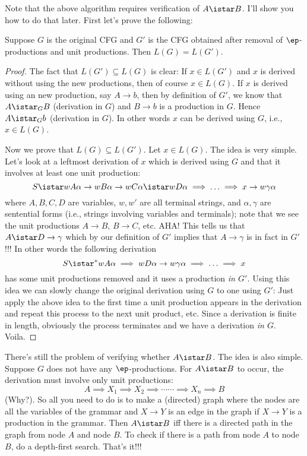 Note that the above algorithm requires verification of $A \istar
B$. I'll show you how to do that later. First let's prove the
following:

\begin{thm}
Suppose $G$ is the original CFG and $G'$ is the CFG obtained after
removal of $\ep$-productions and unit productions. Then $L(G) =
L(G')$.
\end{thm}

\begin{proof}
The fact that $L(G') \subseteq L(G)$ is clear: If $x \in L(G')$
and $x$ is derived without using the new productions, then of
course $x \in L(G)$. If $x$ is derived using an new production,
say $A \rightarrow b$, then by definition of $G'$, we know that $A
\istar_G B$ (derivation in $G$) and $B \rightarrow b$ is a
production in $G$. Hence $A \istar_G b$ (derivation in $G$). In
other words $x$ can be derived using $G$, i.e., $x \in L(G)$.

Now we prove that $L(G) \subseteq L(G')$. Let $x \in L(G)$. The
idea is very simple. Let's look at a leftmost derivation of $x$
which is derived using $G$ and that it involves at least one unit
production:
\[
 S \istar w A \alpha \rightarrow wB \alpha \rightarrow wC \alpha \istar
 wD\alpha \implies \ldots \implies x
 \rightarrow w\gamma\alpha
\]
where $A, B, C, D$ are variables, $w,w'$ are all terminal strings,
and $\alpha, \gamma$ are sentential forms (i.e., strings involving
variables and terminals); note that we see the unit productions $A
\rightarrow B$, $B \rightarrow C$, etc. AHA! This tells us that $A
\istar D \rightarrow \gamma$ which by our definition of $G'$
implies that $A \rightarrow \gamma$ is in fact in $G'$!!! In other
words the following derivation
\[
 S \istar^* w A \alpha \implies wD\alpha \rightarrow w\gamma
 \alpha \implies \ldots \implies x
\]
has some unit productions removed and it uses a production
\textit{ in
$G'$.} Using this idea we can slowly change the original
derivation using $G$ to one using $G'$: Just apply the above idea
to the first time a unit production appears in the derivation and
repeat this process to the next unit product, etc. Since a
derivation is finite in length, obviously the process terminates
and we have a derivation \textit{ in $G$}. Voila.

\end{proof}

There's still the problem of verifying whether $A \istar B$. The
idea is also simple. Suppose $G$ does not have any
$\ep$-productions. For $A \istar B$ to occur, the derivation must
involve only unit productions:
\[
 A \implies X_1 \implies X_2 \implies \cdots \cdots \implies X_n
 \implies B
\]
(Why?). So all you need to do is to make a (directed) graph where
the nodes are all the variables of the grammar and $X \rightarrow
Y$ is an edge in the graph if $X \rightarrow Y$ is a production in
the grammar. Then $A \istar B$ iff there is a directed path in the
graph from node $A$ and node $B$. To check if there is a path from
node $A$ to node $B$, do a depth-first search. That's it!!!

